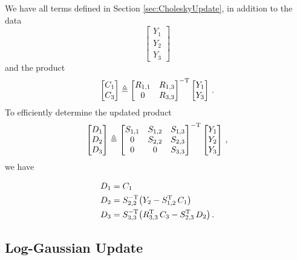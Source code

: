 \documentclass{acmtrans2m}
\begin{document}
We have all terms defined in Section \ref{sec:CholeskyUpdate}, in addition to the data $$\begin{bmatrix} Y_1\\Y_2\\Y_3 \end{bmatrix}$$ and the product $$\begin{bmatrix} C_1\\C_3 \end{bmatrix}\triangleq\begin{bmatrix} R_{1,1} & R_{1,3} \\ 0 & R_{3,3} \end{bmatrix}^{-\mathrm{T}} \begin{bmatrix} Y_1\\Y_3 \end{bmatrix}\,.$$ To efficiently determine the updated product $$\begin{bmatrix} D_1\\D_2\\D_3 \end{bmatrix}\triangleq\begin{bmatrix} S_{1,1} & S_{1,2} & S_{1,3} \\ 0 & S_{2,2} & S_{2,3} \\ 0 & 0 & S_{3,3} \end{bmatrix}^{-\mathrm{T}} \begin{bmatrix} Y_1\\Y_2\\Y_3 \end{bmatrix}\,,$$ we have

\begin{align}
 D_{1}&=C_{1}\\
D_{2} &=S_{2,2}^{-\mathrm{T}}\big(Y_2-S_{1,2}^{\mathrm{T}}\,C_1\big)\\
D_{3}&=S_{3,3}^{-\mathrm{T}}\big(R_{3,3}^{\mathrm{T}} \, C_3-S_{2,3}^{\mathrm{T}}\,D_2\big)\,.
\end{align}

\subsection{Log-Gaussian Update} \label{sec:LogGaussianUpdate}
\end{document}
